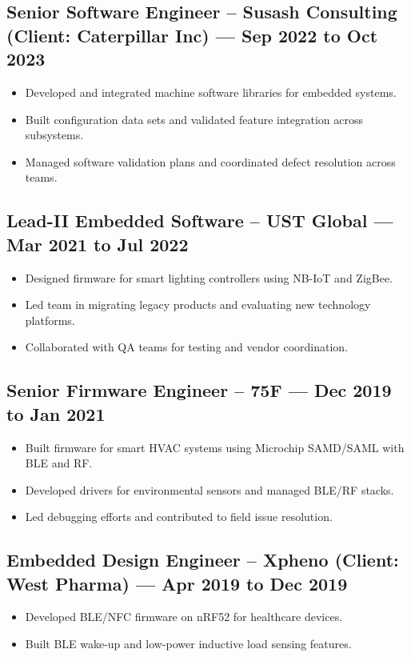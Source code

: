 \documentclass[10pt]{article}
\begin{document}
\subsection*{Senior Software Engineer – Susash Consulting (Client: Caterpillar Inc) — Sep 2022 to Oct 2023}
\begin{itemize}[leftmargin=*]
  \item Developed and integrated machine software libraries for embedded systems.
  \item Built configuration data sets and validated feature integration across subsystems.
  \item Managed software validation plans and coordinated defect resolution across teams.
\end{itemize}

\subsection*{Lead-II Embedded Software – UST Global — Mar 2021 to Jul 2022}
\begin{itemize}[leftmargin=*]
  \item Designed firmware for smart lighting controllers using NB-IoT and ZigBee.
  \item Led team in migrating legacy products and evaluating new technology platforms.
  \item Collaborated with QA teams for testing and vendor coordination.
\end{itemize}

\subsection*{Senior Firmware Engineer – 75F — Dec 2019 to Jan 2021}
\begin{itemize}[leftmargin=*]
  \item Built firmware for smart HVAC systems using Microchip SAMD/SAML with BLE and RF.
  \item Developed drivers for environmental sensors and managed BLE/RF stacks.
  \item Led debugging efforts and contributed to field issue resolution.
\end{itemize}

\subsection*{Embedded Design Engineer – Xpheno (Client: West Pharma) — Apr 2019 to Dec 2019}
\begin{itemize}[leftmargin=*]
  \item Developed BLE/NFC firmware on nRF52 for healthcare devices.
  \item Built BLE wake-up and low-power inductive load sensing features.
\end{itemize}
\end{document}
